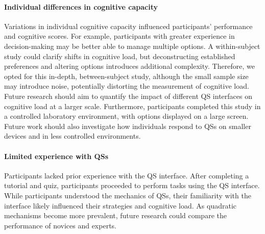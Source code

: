 \paragraph{Individual differences in cognitive capacity}
Variations in individual cognitive capacity influenced participants' performance and cognitive scores. For example, participants with greater experience in decision-making may be better able to manage multiple options.  A within-subject study could clarify shifts in cognitive load, but deconstructing established preferences and altering options introduces additional complexity. Therefore, we opted for this in-depth, between-subject study, although the small sample size may introduce noise, potentially distorting the measurement of cognitive load. Future research should aim to quantify the impact of different QS interfaces on cognitive load at a larger scale. Furthermore, participants completed this study in a controlled laboratory environment, with options displayed on a large screen. Future work should also investigate how individuals respond to QSs on smaller devices and in less controlled environments.

\paragraph{Limited experience with QSs}
Participants lacked prior experience with the QS interface. After completing a tutorial and quiz, participants proceeded to perform tasks using the QS interface. While participants understood the mechanics of QSs, their familiarity with the interface likely influenced their strategies and cognitive load. As quadratic mechanisms become more prevalent, future research could compare the performance of novices and experts.







